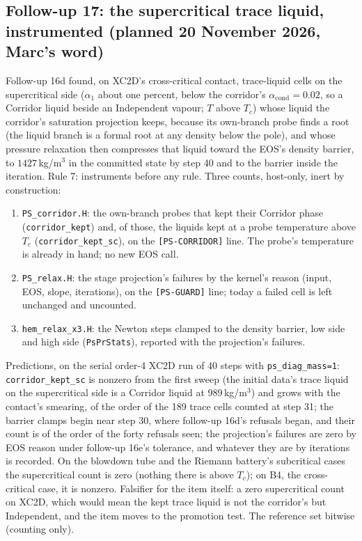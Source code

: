 \documentclass[11pt,a4paper]{article}
\newcommand{\code}[1]{\texttt{\small #1}}
\begin{document}
\subsection*{Follow-up 17: the supercritical trace liquid, instrumented (planned 20 November 2026, Marc's word)}

Follow-up 16d found, on XC2D's cross-critical contact, trace-liquid
cells on the supercritical side ($\alpha_1$ about one percent, below
the corridor's $\alpha_{\mathrm{cond}} = 0.02$, so a Corridor liquid
beside an Independent vapour; $T$ above $T_c$) whose liquid the
corridor's saturation projection keeps, because its own-branch probe
finds a root (the liquid branch is a formal root at any density below
the pole), and whose pressure relaxation then compresses that liquid
toward the EOS's density barrier, to $1427$\,kg/m$^3$ in the committed
state by step 40 and to the barrier inside the iteration.  Rule 7:
instruments before any rule.  Three counts, host-only, inert by
construction:
\begin{enumerate}[nosep]
\item \code{PS\_corridor.H}: the own-branch probes that kept their
      Corridor phase (\code{corridor\_kept}) and, of those, the liquids
      kept at a probe temperature above $T_c$
      (\code{corridor\_kept\_sc}), on the \code{[PS-CORRIDOR]} line.
      The probe's temperature is already in hand; no new EOS call.
\item \code{PS\_relax.H}: the stage projection's failures by the
      kernel's reason (input, EOS, slope, iterations), on the
      \code{[PS-GUARD]} line; today a failed cell is left unchanged
      and uncounted.
\item \code{hem\_relax\_x3.H}: the Newton steps clamped to the density
      barrier, low side and high side (\code{PsPrStats}), reported with
      the projection's failures.
\end{enumerate}
Predictions, on the serial order-4 XC2D run of 40 steps with
\code{ps\_diag\_mass=1}: \code{corridor\_kept\_sc} is nonzero from the
first sweep (the initial data's trace liquid on the supercritical side
is a Corridor liquid at $989$\,kg/m$^3$) and grows with the contact's
smearing, of the order of the 189 trace cells counted at step 31; the
barrier clamps begin near step 30, where follow-up 16d's refusals
began, and their count is of the order of the forty refusals seen;
the projection's failures are zero by EOS reason under follow-up 16e's
tolerance, and whatever they are by iterations is recorded.  On the
blowdown tube and the Riemann battery's subcritical cases the
supercritical count is zero (nothing there is above $T_c$); on B4, the
cross-critical case, it is nonzero.  Falsifier for the item itself: a
zero supercritical count on XC2D, which would mean the kept trace
liquid is not the corridor's but Independent, and the item moves to
the promotion test.  The reference set bitwise (counting only).
\end{document}
